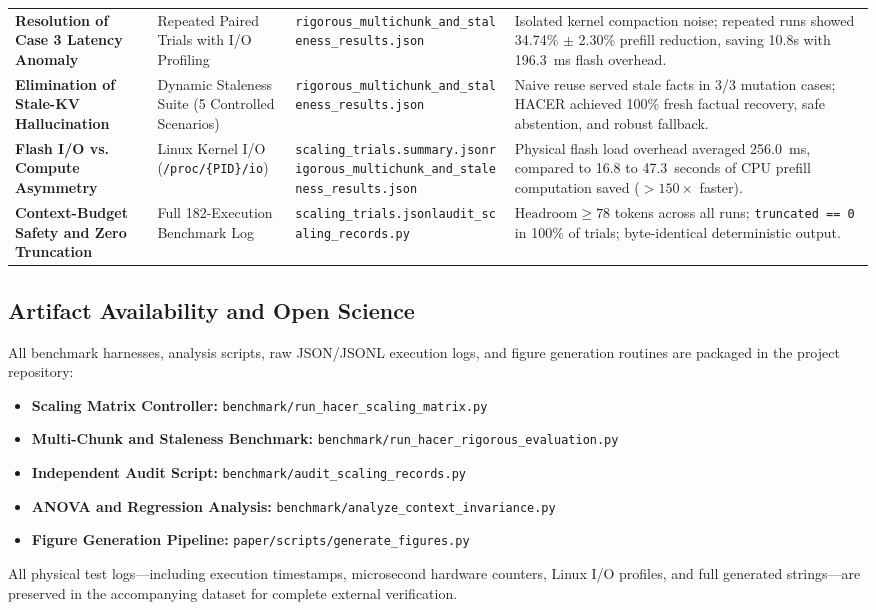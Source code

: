 \begin{table}[t]
\begin{tabular}{p{3.8cm}p{3.2cm}p{4.2cm}p{4.5cm}}
\addlinespace
\textbf{Resolution of Case 3 Latency Anomaly} & Repeated Paired Trials with I/O Profiling & \texttt{rigorous\_multichunk\_and\_}\newline\texttt{staleness\_results.json} & Isolated kernel compaction noise; repeated runs showed 34.74\% $\pm$ 2.30\% prefill reduction, saving 10.8s with 196.3~ms flash overhead. \\
\addlinespace
\textbf{Elimination of Stale-KV Hallucination} & Dynamic Staleness Suite (5 Controlled Scenarios) & \texttt{rigorous\_multichunk\_and\_}\newline\texttt{staleness\_results.json} & Naive reuse served stale facts in 3/3 mutation cases; HACER achieved 100\% fresh factual recovery, safe abstention, and robust fallback. \\
\addlinespace
\textbf{Flash I/O vs. Compute Asymmetry} & Linux Kernel I/O (\texttt{/proc/\{PID\}/io}) & \texttt{scaling\_trials.summary.json}\newline \texttt{rigorous\_multichunk\_and\_}\newline\texttt{staleness\_results.json} & Physical flash load overhead averaged 256.0~ms, compared to 16.8 to 47.3~seconds of CPU prefill computation saved ($>150\times$ faster). \\
\addlinespace
\textbf{Context-Budget Safety and Zero Truncation} & Full 182-Execution Benchmark Log & \texttt{scaling\_trials.jsonl}\newline \texttt{audit\_scaling\_records.py} & $\text{Headroom} \ge 78$ tokens across all runs; \texttt{truncated == 0} in 100\% of trials; byte-identical deterministic output. \\
\bottomrule
\end{tabular}
\end{table}

\subsection{Artifact Availability and Open Science}
All benchmark harnesses, analysis scripts, raw JSON/JSONL execution logs, and figure generation routines are packaged in the project repository:
\begin{itemize}
    \item \textbf{Scaling Matrix Controller:} \texttt{benchmark/run\_hacer\_scaling\_matrix.py}
    \item \textbf{Multi-Chunk and Staleness Benchmark:} \texttt{benchmark/run\_hacer\_rigorous\_evaluation.py}
    \item \textbf{Independent Audit Script:} \texttt{benchmark/audit\_scaling\_records.py}
    \item \textbf{ANOVA and Regression Analysis:} \texttt{benchmark/analyze\_context\_invariance.py}
    \item \textbf{Figure Generation Pipeline:} \texttt{paper/scripts/generate\_figures.py}
\end{itemize}
All physical test logs—including execution timestamps, microsecond hardware counters, Linux I/O profiles, and full generated strings—are preserved in the accompanying dataset for complete external verification.
